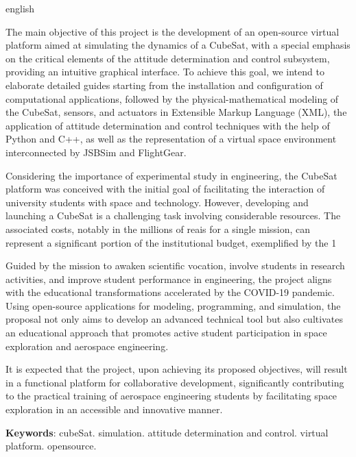 \begin{resumo}[Abstract]
 \begin{otherlanguage*}{english}
 	
 The main objective of this project is the development of an open-source virtual platform aimed at simulating the dynamics of a CubeSat, with a special emphasis on the critical elements of the attitude determination and control subsystem, providing an intuitive graphical interface. To achieve this goal, we intend to elaborate detailed guides starting from the installation and configuration of computational applications, followed by the physical-mathematical modeling of the CubeSat, sensors, and actuators in Extensible Markup Language (XML), the application of attitude determination and control techniques with the help of Python and C++, as well as the representation of a virtual space environment interconnected by JSBSim and FlightGear.
 
 Considering the importance of experimental study in engineering, the CubeSat platform was conceived with the initial goal of facilitating the interaction of university students with space and technology. However, developing and launching a CubeSat is a challenging task involving considerable resources. The associated costs, notably in the millions of reais for a single mission, can represent a significant portion of the institutional budget, exemplified by the 1%
 
 Guided by the mission to awaken scientific vocation, involve students in research activities, and improve student performance in engineering, the project aligns with the educational transformations accelerated by the COVID-19 pandemic. Using open-source applications for modeling, programming, and simulation, the proposal not only aims to develop an advanced technical tool but also cultivates an educational approach that promotes active student participation in space exploration and aerospace engineering.
 
 It is expected that the project, upon achieving its proposed objectives, will result in a functional platform for collaborative development, significantly contributing to the practical training of aerospace engineering students by facilitating space exploration in an accessible and innovative manner.

   \vspace{\onelineskip}
 
   \noindent 
   \textbf{Keywords}:     cubeSat. simulation. attitude determination and control. virtual platform. opensource.
 \end{otherlanguage*}
\end{resumo}